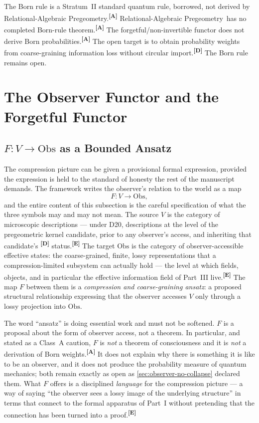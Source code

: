\documentclass[12pt,a4paper,twoside]{article}
\theoremstyle{plain}
\theoremstyle{definition}
\theoremstyle{remark}
\newcommand{\ProjectShort}{Relational-Algebraic Pregeometry}
\newcommand{\RAP}{\ProjectShort}
\newcommand{\catmark}[1]{\textsuperscript{\textsf{\textbf{[#1]}}}}
\begin{document}
\begin{governancebox}
The Born rule is a Stratum~II standard quantum rule, borrowed, not
derived by \RAP.\catmark{A} \RAP\ has no completed Born-rule
theorem.\catmark{A} The forgetful/non-invertible functor does not derive
Born probabilities.\catmark{A} The open target is to obtain probability
weights from coarse-graining information loss without circular
import.\catmark{D} The Born rule remains open.
\end{governancebox}

\section{The Observer Functor and the Forgetful Functor}
\label{sec:observer-functor}

\subsection{\texorpdfstring{$F\colon V \to \mathrm{Obs}$}{F: V to Obs} as a Bounded Ansatz}
\label{subsec:observer-functor-ansatz}

The compression picture can be given a provisional formal expression,
provided the expression is held to the standard of honesty the rest of
the manuscript demands. The framework writes the observer's relation to
the world as a map
\[
 F\colon V \longrightarrow \mathrm{Obs},
\]
and the entire content of this subsection is the careful specification
of what the three symbols may and may not mean. The source $V$ is the
category of microscopic descriptions --- under D20, descriptions at the
level of the pregeometric kernel candidate, prior to any observer's
access, and inheriting that candidate's \catmark{D} status.\catmark{E}
The target $\mathrm{Obs}$ is the category of observer-accessible
effective states: the coarse-grained, finite, lossy representations that
a compression-limited subsystem can actually hold --- the level at which
fields, objects, and in particular the effective information field of
Part~III live.\catmark{E} The map $F$ between them is a
\emph{compression and coarse-graining ansatz}: a proposed structural
relationship expressing that the observer accesses $V$ only through a
lossy projection into $\mathrm{Obs}$.

The word ``ansatz'' is doing essential work and must not be softened.
$F$ is a proposal about the form of observer access, not a theorem. In
particular, and stated as a Class~A caution, $F$ is \emph{not} a theorem
of consciousness and it is \emph{not} a derivation of Born
weights.\catmark{A} It does not explain why there is something it is
like to be an observer, and it does not produce the probability measure
of quantum mechanics; both remain exactly as open as
\cref{sec:observer-no-collapse} declared them. What $F$ offers is a
disciplined \emph{language} for the compression picture --- a way of
saying ``the observer sees a lossy image of the underlying structure''
in terms that connect to the formal apparatus of Part~I without
pretending that the connection has been turned into a proof.\catmark{E}
\end{document}
